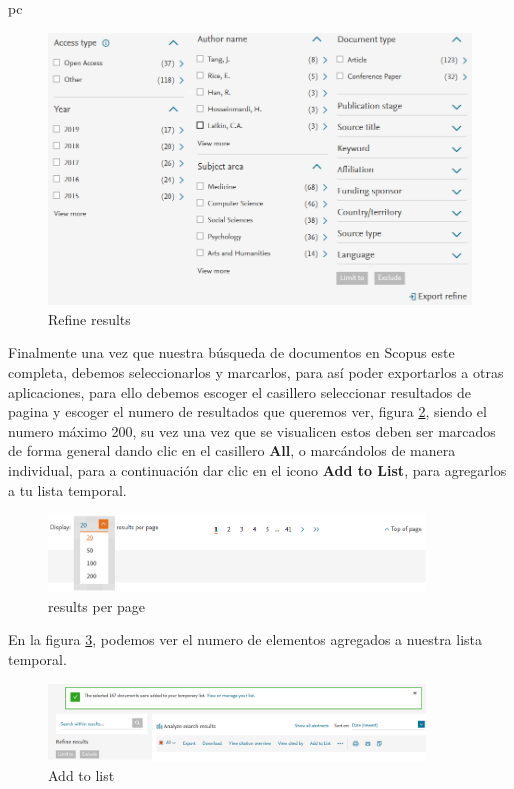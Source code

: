 pc\documentclass[a4paper,12pt,openany]{book}
\begin{document}
\begin{itemize}
        \begin{figure}[H]
        \centering
        \includegraphics[width=12cm]{Scop16.png}
        \caption{Refine results}
        \label{fig:Scop16}
        \end{figure}    

Finalmente una vez que nuestra búsqueda de documentos en Scopus este completa, debemos seleccionarlos y marcarlos, para así poder exportarlos a otras aplicaciones, para ello debemos escoger el casillero seleccionar resultados de pagina y escoger el numero de resultados que queremos ver, figura \ref{fig:scop17}, siendo el numero máximo 200, su vez una vez que se visualicen estos deben ser marcados de forma general dando clic en el casillero \textbf{All}, o marcándolos de manera individual, para a continuación dar clic en el icono \textbf{Add to List}, para agregarlos a tu lista temporal.

        \begin{figure}[H]
        \centering
    	\includegraphics[width=10cm]{Scop17.png}
        \caption{results per page}
        \label{fig:scop17}
        \end{figure}

En la figura \ref{fig:scop18}, podemos ver el numero de elementos agregados a nuestra lista temporal. 

        \begin{figure}[H]
        \centering
    	\includegraphics[width=10cm]{Scop18.png}
        \caption{Add to list}
        \label{fig:scop18}
        \end{figure}


\end{itemize}
\end{document}
